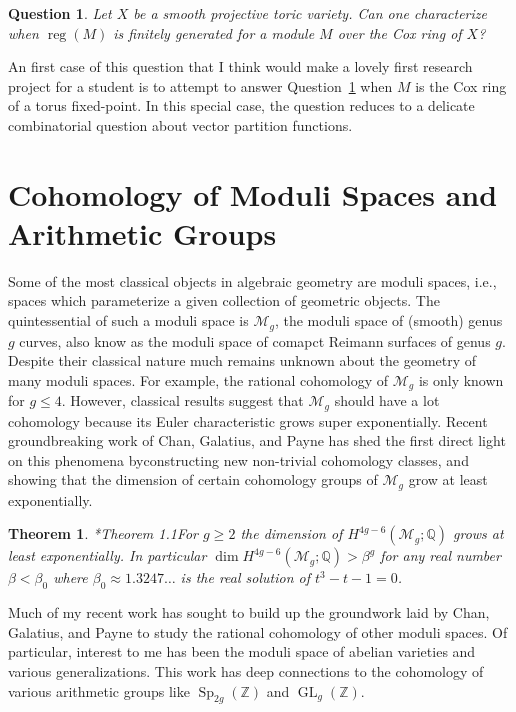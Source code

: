 \documentclass[11pt,reqno]{amsart}
\newtheorem{theorem}[lemma]{Theorem}
\newtheorem{question}[lemma]{Question}
\theoremstyle{remark}
\newcommand{\reg}{\operatorname{reg}}
\newcommand{\GL}{{\operatorname{GL}}}
\newcommand{\Sp}{\operatorname{Sp}}
\newcommand{\cM}{\mathcal{M}}
\newcommand{\Q}{\mathbb{Q}}
\newcommand{\Z}{\mathbb{Z}}
\begin{document}
\begin{question}\label{quest:finitegen}
Let $X$ be a smooth projective toric variety. Can one characterize when $\reg(M)$ is finitely generated for a module $M$ over the Cox ring of $X$?
\end{question} 

An first case of this question that I think would make a lovely first research project for a student is to attempt to answer Question~\ref{quest:finitegen} when $M$ is the Cox ring of a torus fixed-point. In this special case, the question reduces to a delicate combinatorial question about vector partition functions.




\section{Cohomology of Moduli Spaces and Arithmetic Groups}

Some of the most classical objects in algebraic geometry are moduli spaces, i.e., spaces which parameterize a given collection of geometric objects. The quintessential of such a moduli space is $\cM_{g}$, the moduli space of (smooth) genus $g$ curves, also know as the moduli space of comapct Reimann surfaces of genus $g$. Despite their classical nature much remains unknown about the geometry of many moduli spaces. For example, the rational cohomology of $\cM_{g}$ is only known for $g\leq 4$. However, classical results suggest that $\cM_{g}$ should have a lot cohomology because its Euler characteristic grows super exponentially. Recent groundbreaking work of Chan, Galatius, and Payne has shed the first direct light on this phenomena byconstructing new non-trivial cohomology classes, and showing that the dimension of certain cohomology groups of $\cM_{g}$ grow at least exponentially. 

\begin{theorem}\cite{CGP21}*{Theorem 1.1}\label{thm:Mg}
For $g\geq2$ the dimension of $H^{4g-6}(\cM_{g};\Q)$ grows at least exponentially. In particular $\dim H^{4g-6}\left(\cM_{g}; \Q\right) > \beta^{g}$ for any real number $\beta<\beta_{0}$ where $\beta_{0}\approx1.3247\ldots$ is the real solution of $t^3-t-1=0$. 
\end{theorem}

Much of my recent work has sought to build up the groundwork laid by Chan, Galatius, and Payne to study the rational cohomology of other moduli spaces. Of particular, interest to me has been the moduli space of abelian varieties and various generalizations. This work has deep connections to the cohomology of various arithmetic groups like $\Sp_{2g}(\Z)$ and  $\GL_{g}(\Z)$. 
\end{document}
